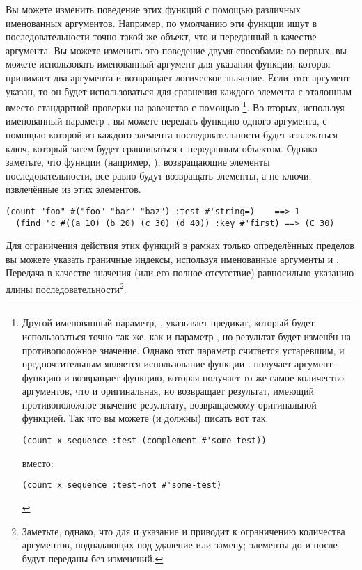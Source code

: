 Вы можете изменить поведение этих функций с помощью различных именованных аргументов.
Например, по умолчанию эти функции ищут в последовательности точно такой же объект, что и
переданный в качестве аргумента.  Вы можете изменить это поведение двумя способами: во-первых,
вы можете использовать именованный аргумент  для указания функции,
которая принимает два аргумента и возвращает логическое значение.  Если этот аргумент
указан, то он будет использоваться для сравнения каждого элемента с эталонным вместо стандартной
проверки на равенство с помощью \footnote{Другой именованный параметр,
  , указывает предикат, который будет использоваться точно так же, как и
  параметр , но результат будет изменён на
  противоположное значение.  Однако этот параметр считается устаревшим, и предпочтительным
  является использование функции .   получает
  аргумент-функцию и возвращает функцию, которая получает то же самое количество
  аргументов, что и оригинальная, но возвращает результат, имеющий противоположное
  значение результату, возвращаемому оригинальной функцией.  Так что вы можете (и должны)
  писать вот так:

\begin{lstlisting}[style=lisprepl]
  (count x sequence :test (complement #'some-test))
\end{lstlisting}

\noindent{}вместо:

\begin{lstlisting}[style=lisprepl]
  (count x sequence :test-not #'some-test)
\end{lstlisting}

}. Во-вторых, используя именованный параметр , вы можете передать функцию одного
аргумента, с помощью которой из каждого элемента последовательности будет извлекаться ключ,
который затем будет сравниваться с переданным объектом.  Однако заметьте, что
функции (например, ), возвращающие элементы последовательности, все равно будут
возвращать элементы, а не ключи, извлечённые из этих элементов.

\begin{lstlisting}[style=lisprepl]
  (count "foo" #("foo" "bar" "baz") :test #'string=)    ==> 1
  (find 'c #((a 10) (b 20) (c 30) (d 40)) :key #'first) ==> (C 30)
\end{lstlisting}

Для ограничения действия этих функций в рамках только определённых пределов вы можете
указать граничные индексы, используя именованные аргументы  и .
Передача  в качестве значения  (или его полное отсутствие)
равносильно указанию длины последовательности\footnote{Заметьте, однако, что для
   и  указание  и  приводит к
  ограничению количества аргументов, подпадающих под удаление или замену; элементы до
   и после  будут переданы без изменений.}.

